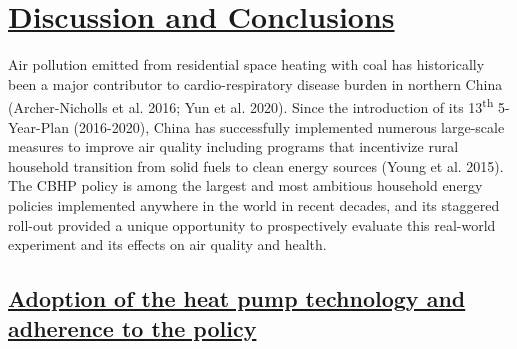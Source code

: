 \documentclass[
  letterpaper,
  DIV=11,
  numbers=noendperiod]{scrartcl}
\providecommand{\DIFadd}[1]{{\protect\color{blue}\underline{#1}}} %
\providecommand{\DIFaddbegin}{} %
\providecommand{\DIFaddend}{} %
\providecommand{\DIFdelbegin}{} %
\providecommand{\DIFdelend}{} %
\newcommand{\DIFscaledelfig}{0.5}
\newlength{\DIFdelgraphicswidth} %
\newlength{\DIFdelgraphicsheight} %
\newcommand{\DIFaddincludegraphics}[2][]{{\color{blue}\fbox{\DIFOincludegraphics[#1]{#2}}}} %
\newcommand{\DIFdelincludegraphics}[2][]{%
\sbox{\DIFdelgraphicsbox}{\DIFOincludegraphics[#1]{#2}}%
\settoboxwidth{\DIFdelgraphicswidth}{\DIFdelgraphicsbox} %
\settoboxtotalheight{\DIFdelgraphicsheight}{\DIFdelgraphicsbox} %
\scalebox{\DIFscaledelfig}{%
\parbox[b]{\DIFdelgraphicswidth}{\usebox{\DIFdelgraphicsbox}\\[-\baselineskip] \rule{\DIFdelgraphicswidth}{0em}}\llap{\resizebox{\DIFdelgraphicswidth}{\DIFdelgraphicsheight}{%
\setlength{\unitlength}{\DIFdelgraphicswidth}%
\begin{picture}(1,1)%
\thicklines\linethickness{2pt} %
{\color[rgb]{1,0,0}\put(0,0){\framebox(1,1){}}}%
{\color[rgb]{1,0,0}\put(0,0){\line( 1,1){1}}}%
{\color[rgb]{1,0,0}\put(0,1){\line(1,-1){1}}}%
\end{picture}%
}\hspace*{3pt}}} %
} %
\DeclareRobustCommand{\DIFaddbegin}{\DIFOaddbegin \let\includegraphics\DIFaddincludegraphics} %
\DeclareRobustCommand{\DIFaddend}{\DIFOaddend \let\includegraphics\DIFOincludegraphics} %
\DeclareRobustCommand{\DIFdelbegin}{\DIFOdelbegin \let\includegraphics\DIFdelincludegraphics} %
\DeclareRobustCommand{\DIFdelend}{\DIFOaddend \let\includegraphics\DIFOincludegraphics} %
\begin{document}
\DIFdelbegin %
\DIFdelend \DIFaddbegin \section{\DIFadd{Discussion and Conclusions}}\label{discussion-and-conclusions}
\DIFaddend 

Air pollution emitted from residential space heating with coal has
historically been a major contributor to cardio-respiratory disease
burden in northern China (Archer-Nicholls et al. 2016; Yun et al. 2020).
Since the introduction of its 13\textsuperscript{th} 5-Year-Plan
(2016-2020), China has successfully implemented numerous large-scale
measures to improve air quality including programs that incentivize
rural household transition from solid fuels to clean energy sources
(Young et al. 2015). The CBHP policy is among the largest and most
ambitious household energy policies implemented anywhere in the world in
recent decades, and its staggered roll-out provided a unique opportunity
to prospectively evaluate this real-world experiment and its effects on
air quality and health.

\DIFdelbegin %
\DIFdelend \DIFaddbegin \subsection{\DIFadd{Adoption of the heat pump technology and adherence to the
policy}}\label{adoption-of-the-heat-pump-technology-and-adherence-to-the-policy}
\DIFaddend 
\end{document}
